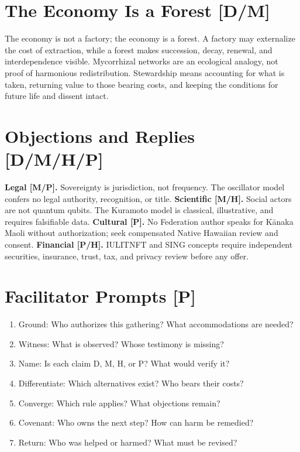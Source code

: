 \documentclass[12pt]{article}
\begin{document}
\section{The Economy Is a Forest [D/M]}
The economy is not a factory; the economy is a forest. A factory may externalize the cost of extraction, while a forest makes succession, decay, renewal, and interdependence visible. Mycorrhizal networks are an ecological analogy, not proof of harmonious redistribution. Stewardship means accounting for what is taken, returning value to those bearing costs, and keeping the conditions for future life and dissent intact.

\section{Objections and Replies [D/M/H/P]}
\textbf{Legal [M/P].} Sovereignty is jurisdiction, not frequency. The oscillator model confers no legal authority, recognition, or title.
\textbf{Scientific [M/H].} Social actors are not quantum qubits. The Kuramoto model is classical, illustrative, and requires falsifiable data.
\textbf{Cultural [P].} No Federation author speaks for Kānaka Maoli without authorization; seek compensated Native Hawaiian review and consent.
\textbf{Financial [P/H].} IULITNFT and SING concepts require independent securities, insurance, trust, tax, and privacy review before any offer.
\section{Facilitator Prompts [P]}
\begin{enumerate}
\item Ground: Who authorizes this gathering? What accommodations are needed?
\item Witness: What is observed? Whose testimony is missing?
\item Name: Is each claim D, M, H, or P? What would verify it?
\item Differentiate: Which alternatives exist? Who bears their costs?
\item Converge: Which rule applies? What objections remain?
\item Covenant: Who owns the next step? How can harm be remedied?
\item Return: Who was helped or harmed? What must be revised?
\end{enumerate}
\end{document}
